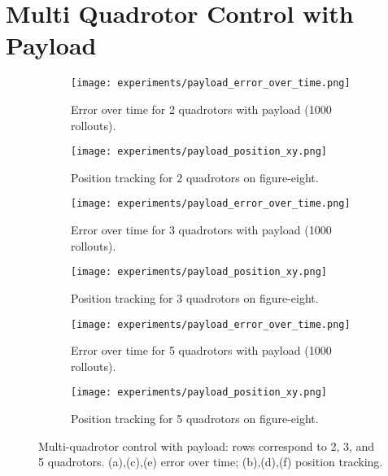 \section{Multi Quadrotor Control with Payload}
\begin{figure}[ht]
    \centering
    \begin{subfigure}[b]{0.49\textwidth}
        \texttt{[image: experiments/payload\_error\_over\_time.png]}
        \caption{Error over time for 2 quadrotors with payload (1000 rollouts).}
        \label{fig:payload_error_2quads}
    \end{subfigure}
    \hfill
    \begin{subfigure}[b]{0.49\textwidth}
        \texttt{[image: experiments/payload\_position\_xy.png]}
        \caption{Position tracking for 2 quadrotors on figure-eight.}
        \label{fig:payload_position_2quads}
    \end{subfigure}

    \vspace{1em}

    \begin{subfigure}[b]{0.49\textwidth}
        \texttt{[image: experiments/payload\_error\_over\_time.png]}
        \caption{Error over time for 3 quadrotors with payload (1000 rollouts).}
        \label{fig:payload_error_3quads}
    \end{subfigure}
    \hfill
    \begin{subfigure}[b]{0.49\textwidth}
        \texttt{[image: experiments/payload\_position\_xy.png]}
        \caption{Position tracking for 3 quadrotors on figure-eight.}
        \label{fig:payload_position_3quads}
    \end{subfigure}

    \vspace{1em}

    \begin{subfigure}[b]{0.49\textwidth}
        \texttt{[image: experiments/payload\_error\_over\_time.png]}
        \caption{Error over time for 5 quadrotors with payload (1000 rollouts).}
        \label{fig:payload_error_5quads}
    \end{subfigure}
    \hfill
    \begin{subfigure}[b]{0.49\textwidth}
        \texttt{[image: experiments/payload\_position\_xy.png]}
        \caption{Position tracking for 5 quadrotors on figure-eight.}
        \label{fig:payload_position_5quads}
    \end{subfigure}

    \caption{Multi-quadrotor control with payload: rows correspond to 2, 3, and 5 quadrotors. (a),(c),(e) error over time; (b),(d),(f) position tracking.}
    \label{fig:multi_quad_payload}
\end{figure}
